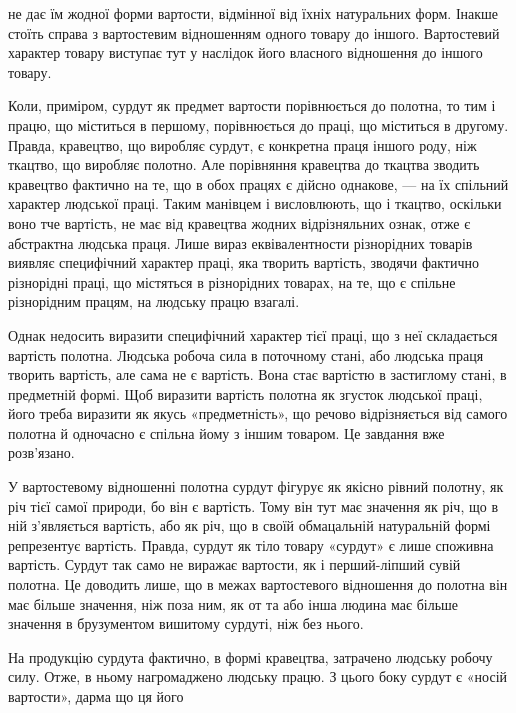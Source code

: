 \parcont{}  %
не дає їм жодної форми вартости, відмінної від їхніх натуральних форм. Інакше стоїть справа з
вартостевим відношенням одного товару до іншого. Вартостевий характер товару виступає тут у наслідок
його власного відношення до іншого товару.

Коли, приміром, сурдут як предмет вартости порівнюється до полотна, то тим і працю, що міститься в
першому, порівнюється до праці, що міститься в другому. Правда, кравецтво, що виробляє сурдут, є
конкретна праця іншого роду, ніж ткацтво, що виробляє полотно. Але порівняння кравецтва до ткацтва
зводить кравецтво фактично на те, що в обох працях є дійсно однакове, — на їх спільний характер
людської праці. Таким манівцем і висловлюють, що і ткацтво, оскільки воно тче вартість, не має від
кравецтва жодних відрізняльних ознак, отже є абстрактна людська праця. Лише вираз еквівалентности
різнорідних товарів виявляє специфічний характер праці, яка творить вартість, зводячи фактично
різнорідні праці, що містяться в різнорідних товарах, на те, що є спільне різнорідним працям, на
людську працю взагалі.

Однак недосить виразити специфічний характер тієї праці, що з неї складається вартість полотна.
Людська робоча сила в поточному стані, або людська праця творить вартість, але сама не є вартість.
Вона стає вартістю в застиглому стані, в предметній формі. Щоб виразити вартість полотна як згусток
людської праці, його треба виразити як якусь «предметність», що речово відрізняється від самого
полотна й одночасно є спільна йому з іншим товаром. Це завдання вже розв’язано.

У вартостевому відношенні полотна сурдут фігурує як якісно рівний полотну, як річ тієї самої
природи, бо він є вартість. Тому він тут має значення як річ, що в ній з’являється вартість, або як
річ, що в своїй обмацальній натуральній формі репрезентує вартість. Правда, сурдут як тіло товару
«сурдут» є лише споживна вартість. Сурдут так само не виражає вартости, як і перший-ліпший сувій
полотна. Це доводить лише, що в межах вартостевого відношення до полотна він має більше значення,
ніж поза ним, як от та або інша людина має більше значення в брузументом вишитому сурдуті, ніж без
нього.

На продукцію сурдута фактично, в формі кравецтва, затрачено людську робочу силу. Отже, в ньому
нагромаджено людську працю. З цього боку сурдут є «носій вартости», дарма що ця його
\parbreak{}  %
